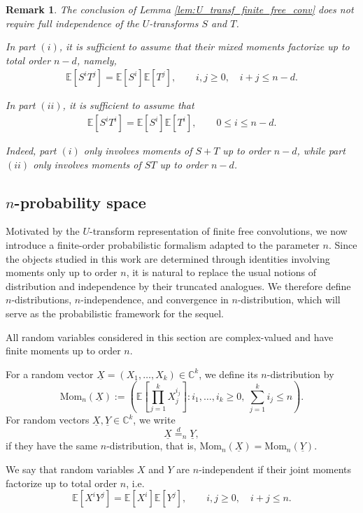 \documentclass[a4paper,11pt]{amsart}
\numberwithin{equation}{section}
\newtheorem{remark}[theorem]{Remark}
\newcommand{\C}{\mathbb{C}}
\newcommand{\E}{\mathbb{E}}
\begin{document}
\begin{remark}
The conclusion of Lemma \ref{lem:U_transf_finite_free_conv} does not require full independence of the \(U\)-transforms \(S\) and \(T\).

In part \((i)\), it is sufficient to assume that their mixed moments factorize up to total order \(n-d\), namely,
\begin{align}\label{eq:add}
\E[S^iT^j]=\E[S^i]\E[T^j], \qquad i,j\ge 0,\quad i+j\le n-d.
\end{align}

In part \((ii)\), it is sufficient to assume that
\begin{align}\label{eq:mult}
\E[S^iT^i]=\E[S^i]\E[T^i], \qquad 0\le i\le n-d.
\end{align}

Indeed, part \((i)\) only involves moments of \(S+T\) up to order \(n-d\), while part \((ii)\) only involves moments of \(ST\) up to order \(n-d\).
\end{remark}


\subsection{\texorpdfstring{$n$-probability space}{n-probability space}}
Motivated by the \(U\)-transform representation of finite free convolutions, we now introduce a finite-order probabilistic formalism adapted to the parameter \(n\). Since the objects studied in this work are determined through identities involving moments only up to order \(n\), it is natural to replace the usual notions of distribution and independence by their truncated analogues. We therefore define \(n\)-distributions, \(n\)-independence, and convergence in \(n\)-distribution, which will serve as the probabilistic framework for the sequel.

All random variables considered in this section are complex-valued and have finite moments up to order \(n\).

For a random vector \(\underline{X}=(X_1,\dots,X_k)\in\C^k\), we define its \(n\)-distribution by
\[
\mathrm{Mom}_n(\underline{X})
:=
\left(
\E\!\left[\prod_{j=1}^k X_j^{i_j}\right]
\colon i_1,\dots,i_k\ge 0,\ \sum_{j=1}^k i_j\le n
\right).
\]
For random vectors \(\underline{X},\underline{Y}\in\C^k\), we write
\[
\underline{X}\overset{d}{=}_n \underline{Y},
\]
if they have the same \(n\)-distribution, that is,
\(\mathrm{Mom}_n(\underline{X})=\mathrm{Mom}_n(\underline{Y})\).

We say that random variables \(X\) and \(Y\) are \(n\)-independent if their joint moments factorize up to total order \(n\), i.e.
\[
\E[X^iY^j]=\E[X^i]\E[Y^j],
\qquad i,j\ge 0,\quad i+j\le n.
\]
\end{document}
